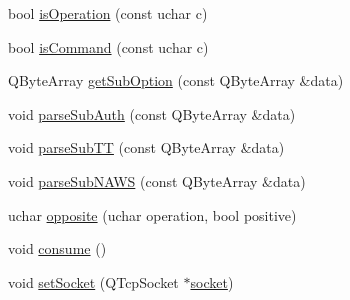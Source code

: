 \begin{DoxyCompactItemize}
\item 
bool \hyperlink{classQtTelnetPrivate_adf047094261734d80497ed5e312529f3}{isOperation} (const uchar c)
\item 
bool \hyperlink{classQtTelnetPrivate_a87dc935d78d08e61c0c01742d8cafa6a}{isCommand} (const uchar c)
\item 
QByteArray \hyperlink{classQtTelnetPrivate_a50887aa4aa50718b8d8d7346becca84f}{getSubOption} (const QByteArray \&data)
\item 
void \hyperlink{classQtTelnetPrivate_a7b7516b63445c980c4159513371c6bba}{parseSubAuth} (const QByteArray \&data)
\item 
void \hyperlink{classQtTelnetPrivate_a9477255e82131a4c31f1cc643dda7298}{parseSubTT} (const QByteArray \&data)
\item 
void \hyperlink{classQtTelnetPrivate_a85ddee7ac8158da81abec0762f7b3bd3}{parseSubNAWS} (const QByteArray \&data)
\item 
uchar \hyperlink{classQtTelnetPrivate_ac3faf60570fc602551fb9b5d0afa3157}{opposite} (uchar operation, bool positive)
\item 
void \hyperlink{classQtTelnetPrivate_aaf74ce757fd90148cb60be32458d5dae}{consume} ()
\item 
void \hyperlink{classQtTelnetPrivate_a1bb6ff5139d2a05c09aad37f64042687}{setSocket} (QTcpSocket $\ast$\hyperlink{classQtTelnetPrivate_a8a3800a6c6c14c4501ac0cb5d1f9996b}{socket})
\end{DoxyCompactItemize}
